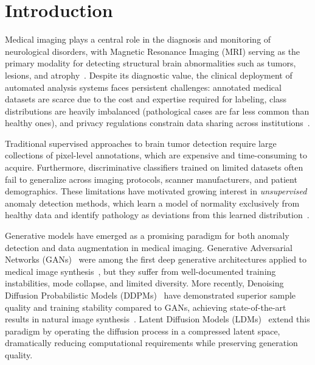 \section{Introduction}
\label{sec:introduction}

Medical imaging plays a central role in the diagnosis and monitoring of neurological disorders, with Magnetic Resonance Imaging (MRI) serving as the primary modality for detecting structural brain abnormalities such as tumors, lesions, and atrophy~\cite{baur2021autoencoders}. Despite its diagnostic value, the clinical deployment of automated analysis systems faces persistent challenges: annotated medical datasets are scarce due to the cost and expertise required for labeling, class distributions are heavily imbalanced (pathological cases are far less common than healthy ones), and privacy regulations constrain data sharing across institutions~\cite{yi2019generative}.

Traditional supervised approaches to brain tumor detection require large collections of pixel-level annotations, which are expensive and time-consuming to acquire. Furthermore, discriminative classifiers trained on limited datasets often fail to generalize across imaging protocols, scanner manufacturers, and patient demographics. These limitations have motivated growing interest in \textit{unsupervised} anomaly detection methods, which learn a model of normality exclusively from healthy data and identify pathology as deviations from this learned distribution~\cite{baur2021autoencoders, schlegl2019f}.

Generative models have emerged as a promising paradigm for both anomaly detection and data augmentation in medical imaging. Generative Adversarial Networks (GANs)~\cite{goodfellow2014generative} were among the first deep generative architectures applied to medical image synthesis~\cite{yi2019generative}, but they suffer from well-documented training instabilities, mode collapse, and limited diversity. More recently, Denoising Diffusion Probabilistic Models (DDPMs)~\cite{ho2020denoising} have demonstrated superior sample quality and training stability compared to GANs, achieving state-of-the-art results in natural image synthesis~\cite{dhariwal2021diffusion}. Latent Diffusion Models (LDMs)~\cite{rombach2022high} extend this paradigm by operating the diffusion process in a compressed latent space, dramatically reducing computational requirements while preserving generation quality.

